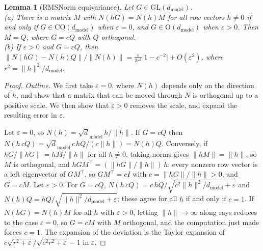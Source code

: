 \documentclass[10pt]{article}
\newtheorem{lemma}[theorem]{Lemma}
\theoremstyle{definition}
\theoremstyle{remark}
\newcommand{\dm}{d_{\mathrm{model}}}
\newcommand{\GL}{\mathrm{GL}}
\newcommand{\Ort}{\mathrm{O}}
\newcommand{\CO}{\mathrm{CO}}
\newcommand{\norm}[1]{\lVert #1\rVert}
\begin{document}
\begin{lemma}[RMSNorm equivariance]\label{lem:rms}
Let $G \in \GL(\dm)$.\\
\textup{(a)} There is a matrix $M$ with $N(hG) = N(h)M$ for all row vectors $h \neq 0$ if and only if $G \in \CO(\dm)$ when $\varepsilon = 0$, and $G \in \Ort(\dm)$ when $\varepsilon > 0$. Then $M = Q$, where $G = cQ$ with $Q$ orthogonal.\\
\textup{(b)} If $\varepsilon > 0$ and $G = cQ$, then $\norm{N(hG) - N(h)Q}/\norm{N(h)} = \tfrac{\varepsilon}{2r^2}\lvert 1 - c^{-2}\rvert + O(\varepsilon^2)$, where $r^2 = \norm{h}^2/\dm$.
\end{lemma}
\begin{proof}
\emph{Outline.} We first take $\varepsilon = 0$, where $N(h)$ depends only on the direction of $h$, and show that a matrix that can be moved through $N$ is orthogonal up to a positive scale. We then show that $\varepsilon > 0$ removes the scale, and expand the resulting error in $\varepsilon$.

Let $\varepsilon = 0$, so $N(h) = \sqrt \dm\,h/\norm{h}$. If $G = cQ$ then $N(h\,cQ) = \sqrt \dm\,c\,hQ/(c\norm{h}) = N(h)Q$. Conversely, if $hG/\norm{hG} = hM/\norm{h}$ for all $h \neq 0$, taking norms gives $\norm{hM} = \norm{h}$, so $M$ is orthogonal, and $hGM^\top = (\norm{hG}/\norm{h})\,h$: every nonzero row vector is a left eigenvector of $GM^\top$, so $GM^\top = cI$ with $c = \norm{hG}/\norm{h} > 0$, and $G = cM$. Let $\varepsilon > 0$. For $G = cQ$, $N(h\,cQ) = c\,hQ/\sqrt{c^2\norm{h}^2/\dm + \varepsilon}$ and $N(h)Q = hQ/\sqrt{\norm{h}^2/\dm + \varepsilon}$; these agree for all $h$ if and only if $c = 1$. If $N(hG) = N(h)M$ for all $h$ with $\varepsilon > 0$, letting $\norm{h} \to \infty$ along rays reduces to the case $\varepsilon = 0$, so $G = cM$ with $M$ orthogonal, and the computation just made forces $c = 1$. The expansion of the deviation is the Taylor expansion of $c\sqrt{r^2+\varepsilon}/\sqrt{c^2r^2 + \varepsilon} - 1$ in $\varepsilon$.
\end{proof}
\end{document}
